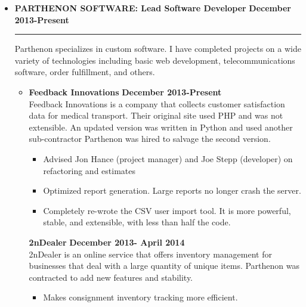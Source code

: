 \documentclass[overlapped]{res}
\begin{document}
\begin{resume}
\begin{itemize}[leftmargin=0in]
    \item[] 
        \textbf{PARTHENON SOFTWARE: Lead Software Developer} \hfill \textbf{December 2013-Present} \\[-0.1in] \rule{\textwidth}{0.5pt}
        Parthenon specializes in custom software. I have completed projects on a wide variety of technologies including basic 
        web development, telecommunications software, order fulfillment, and others. \vspace{0.125in}
        \begin{itemize}[leftmargin=0in]
            \item[] 
                \begin{samepage}
                    \textbf{Feedback Innovations} \hfill \textbf{December 2013-Present} \\
                    Feedback Innovations is a company that collects customer satisfaction data for medical transport. Their original site 
                    used PHP and was not extensible.  An updated version was written in Python and used another sub-contractor Parthenon 
                    was hired to salvage the second version.
                    \begin{itemize}
                        \item[\textbullet] Advised Jon Hance (project manager) and Joe Stepp (developer) on refactoring and estimates
                        \item[\textbullet] Optimized report generation. Large reports no longer crash the server.
                        \item[\textbullet] Completely re-wrote the CSV user import tool. It is more powerful, stable, and extensible, with
                                           less than half the code.
                    \end{itemize}
                \end{samepage}
                \begin{samepage}
                    \textbf{2nDealer} \hfill \textbf{December 2013- April 2014} \\
                    2nDealer is an online service that offers inventory management for businesses that deal with a large quantity of unique items. 
                    Parthenon was contracted to add new features and stability.
                    \begin{itemize}
                        \item[\textbullet] Makes consignment inventory tracking more efficient.

\end{itemize}
\end{samepage}
\end{itemize}
\end{itemize}
\end{resume}
\end{document}
